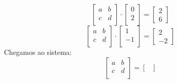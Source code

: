 \documentclass[english,ngerman,parskip=half]{scrartcl}
\begin{document}
\begin{enumerate}
\begin{enumerate}
                \begin{equation}
                    \begin{bmatrix}
                    a & b \\
                    c & d \\
                    \end{bmatrix}
                    \cdot
                    \begin{bmatrix}
                    0 \\
                    2 \\
                    \end{bmatrix}
                    =
                    \begin{bmatrix}
                    2 \\
                    6
                    \end{bmatrix}
                \end{equation}
                \begin{equation}
                    \begin{bmatrix}
                    a & b \\
                    c & d \\
                    \end{bmatrix}
                    \cdot
                    \begin{bmatrix}
                    1 \\
                    -1 \\
                    \end{bmatrix}
                    =
                    \begin{bmatrix}
                    2 \\
                    -2
                    \end{bmatrix}
                \end{equation}
                Chegamos ao sistema:
                 \\
                \begin{equation}
                    \begin{bmatrix}
                        a&b \\
                        c&d \\
                    \end{bmatrix}
                    =
                    \begin{bmatrix}

\end{bmatrix}
\end{equation}
\end{enumerate}
\end{enumerate}
\end{document}
